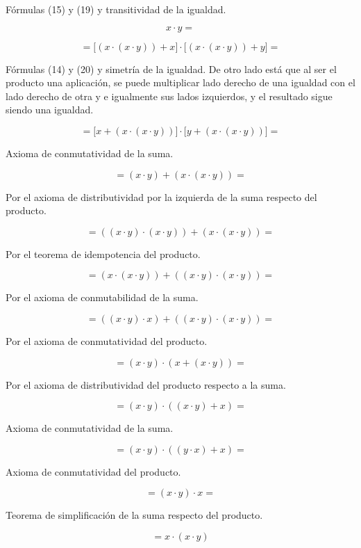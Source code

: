 Fórmulas (15) y (19) y transitividad de la igualdad.

\[{}{{x \cdot y} =}\]

\[{= {{\lbrack{{({x \cdot {({x \cdot y})}})} + x}\rbrack} \cdot {\lbrack{{({x \cdot {({x \cdot y})}})} + y}\rbrack}}} =\]

Fórmulas (14) y (20) y simetría de la igualdad. De otro lado está que al
ser el producto una aplicación, se puede multiplicar lado derecho de una
igualdad con el lado derecho de otra y e igualmente sus lados
izquierdos, y el resultado sigue siendo una igualdad.

\[{= {{\lbrack{x + {({x \cdot {({x \cdot y})}})}}\rbrack} \cdot {\lbrack{y + {({x \cdot {({x \cdot y})}})}}\rbrack}}} =\]

Axioma de conmutatividad de la suma.

\[{= {{({x \cdot y})} + {({x \cdot {({x \cdot y})}})}}} =\]

Por el axioma de distributividad por la izquierda de la suma respecto
del producto.

\[{= {\left( {{({x \cdot y})} \cdot {({x \cdot y})}} \right) + {({x \cdot {({x \cdot y})}})}}} =\]

Por el teorema de idempotencia del producto.

\[{= {\left( {x \cdot {({x \cdot y})}} \right) + \left( {{({x \cdot y})} \cdot {({x \cdot y})}} \right)}} =\]

Por el axioma de conmutabilidad de la suma.

\[{= {\left( {{({x \cdot y})} \cdot x} \right) + \left( {{({x \cdot y})} \cdot {({x \cdot y})}} \right)}} =\]

Por el axioma de conmutatividad del producto.

\[{= {{({x \cdot y})} \cdot {({x + {({x \cdot y})}})}}} =\]

Por el axioma de distributividad del producto respecto a la suma.

\[{= {{({x \cdot y})} \cdot {({{({x \cdot y})} + x})}}} =\]

Axioma de conmutatividad de la suma.

\[{= {{({x \cdot y})} \cdot {({{({y \cdot x})} + x})}}} =\]

Axioma de conmutatividad del producto.

\[{= {{({x \cdot y})} \cdot x}} =\]

Teorema de simplificación de la suma respecto del producto.

\[= {x \cdot {({x \cdot y})}}\]

